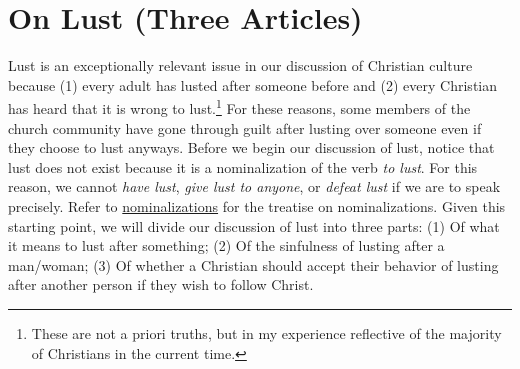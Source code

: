 \documentclass[a4paper, parskip=full, 12pt]{article}
\begin{document}
\section{On Lust (Three Articles)}
Lust is an exceptionally relevant issue in our discussion of Christian culture because (1) every adult has lusted after someone before and (2) every Christian has heard that it is wrong to lust.\footnote{These are not a priori truths, but in my experience reflective of the majority of Christians in the current time.} For these reasons, some members of the church community have gone through guilt after lusting over someone even if they choose to lust anyways. Before we begin our discussion of lust, notice that lust does not exist because it is a nominalization of the verb \textit{to lust}. For this reason, we cannot \textit{have lust}, \textit{give lust to anyone}, or \textit{defeat lust} if we are to speak precisely. Refer to \underline{nominalizations} for the treatise on nominalizations. Given this starting point, we will divide our discussion of lust into three parts: (1) Of what it means to lust after something; (2) Of the sinfulness of lusting after a man/woman; (3) Of whether a Christian should accept their behavior of lusting after another person if they wish to follow Christ. \\
\end{document}
